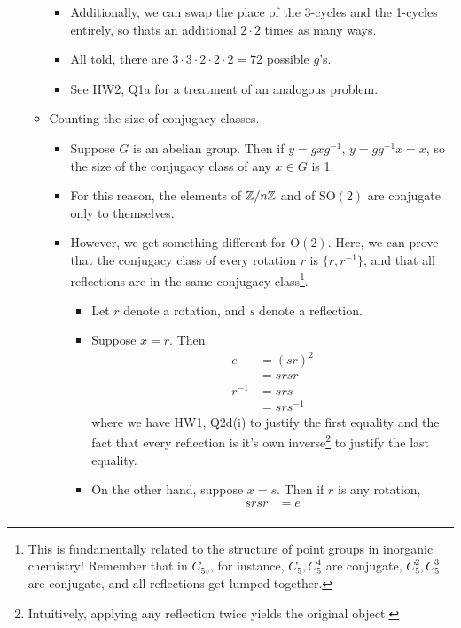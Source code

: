 \documentclass[../notes.tex]{subfiles}
\begin{document}
\begin{itemize}
\begin{itemize}
\begin{itemize}
            \item Additionally, we can swap the place of the 3-cycles and the 1-cycles entirely, so thats an additional $2\cdot 2$ times as many ways.
            \item All told, there are $3\cdot 3\cdot 2\cdot 2\cdot 2=72$ possible $g$'s.
            \item See HW2, Q1a for a treatment of an analogous problem.
        \end{itemize}
        \item Counting the size of conjugacy classes.
        \begin{itemize}
            \item Suppose $G$ is an abelian group. Then if $y=gxg^{-1}$, $y=gg^{-1}x=x$, so the size of the conjugacy class of any $x\in G$ is 1.
            \item For this reason, the elements of $\mathbb{Z}/n\mathbb{Z}$ and of $\text{SO}(2)$ are conjugate only to themselves.
            \item However, we get something different for $\text{O}(2)$. Here, we can prove that the conjugacy class of every rotation $r$ is $\{r,r^{-1}\}$, and that all reflections are in the same conjugacy class\footnote{This is fundamentally related to the structure of point groups in inorganic chemistry! Remember that in $C_{5v}$, for instance, $C_5,C_5^4$ are conjugate, $C_5^2,C_5^3$ are conjugate, and all reflections get lumped together.}.
            \begin{itemize}
                \item Let $r$ denote a rotation, and $s$ denote a reflection.
                \item Suppose $x=r$. Then
                \begin{align*}
                    e &= (sr)^2\\
                    &= srsr\\
                    r^{-1} &= srs\\
                    &= srs^{-1}
                \end{align*}
                where we have HW1, Q2d(i) to justify the first equality and the fact that every reflection is it's own inverse\footnote{Intuitively, applying any reflection twice yields the original object.} to justify the last equality.
                \item On the other hand, suppose $x=s$. Then if $r$ is any rotation,
                \begin{align*}
                    srsr &= e\\

\end{align*}
\end{itemize}
\end{itemize}
\end{itemize}
\end{itemize}
\end{document}
